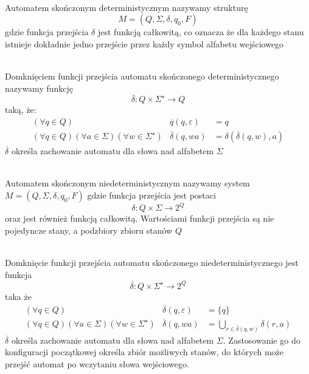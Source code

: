 \begin{df}~\\
	Automatem skończonym deterministycznym nazywamy strukturę 
	\begin{equation}
		M = (Q, \Sigma, \delta, q_0, F)
	\end{equation}
	gdzie funkcja przejścia $\delta$ jest funkcją całkowitą, co oznacza że dla każdego 
	stanu istnieje dokładnie jedno przejście przez każdy symbol alfabetu wejściowego
\end{df}

\begin{df}~\\
	Domknięciem funkcji przejścia automatu skończonego deterministycznego nazywamy
	funkcję
	\begin{equation}
		\overline{\delta} : Q\times\Sigma^\star \rightarrow Q
	\end{equation}
	taką, że:
	\begin{eqnarray}
		(\forall q\in Q) &\overline{q}(q, \varepsilon)& = q \\
		(\forall q\in Q)(\forall a\in\Sigma)(\forall w\in\Sigma^\star) 
		&\overline{\delta}(q, wa)& = \delta(\overline{\delta}(q, w), a)
	\end{eqnarray}
	$\overline{\delta}$ określa zachowanie automatu dla słowa nad alfabetem $\Sigma$
\end{df}

\begin{df}~\\
	Automatem skończonym niedeterministycznym nazywamy system 
	$M = (Q, \Sigma, \delta, q_0, F)$ gdzie funkcja przejścia jest postaci 
	\begin{equation}
		\delta : Q\times\Sigma \rightarrow 2^Q
	\end{equation}
	oraz jest również funkcją całkowitą. Wartościami funkcji przejścia są nie pojedyncze stany,
	a podzbiory zbioru stanów $Q$
\end{df}

\begin{df}~\\
	Domknięcie funkcji przejścia automatu skończonego niedeterministycznego jest funkcja
	\begin{equation}
		\overline{\delta} : Q\times\Sigma^\star \rightarrow 2^Q
	\end{equation}
	taka że
	\begin{eqnarray}
		(\forall q\in Q) &\overline{\delta}(q, \varepsilon)& = \{q\} \\
		(\forall q\in Q)(\forall a\in\Sigma)(\forall w\in\Sigma^\star) &\overline{\delta}(q, wa)& = \bigcup_{r\in\overline{\delta}(q,w)}\delta(r, a)
	\end{eqnarray}
	$\overline{\delta}$ określa zachowanie automatu dla słowa nad alfabetem $\Sigma$. Zastosowanie go do konfiguracji
	początkowej określa zbiór możliwych stanów, do których może przejść automat po wczytaniu słowa wejściowego.
\end{df}


